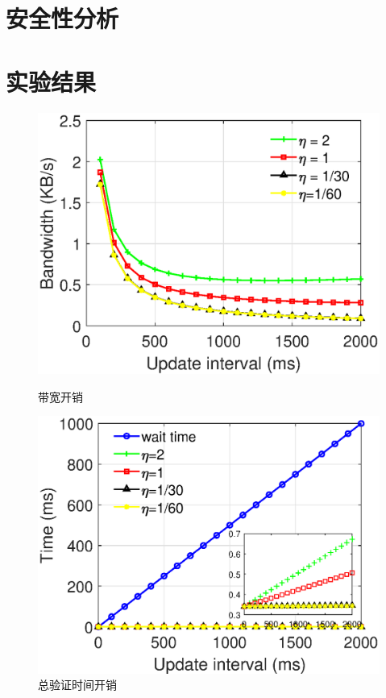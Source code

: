 \section{安全性分析}

\section{实验结果}
\label{sec:experiments}
\begin{figure}[ht]
  \begin{minipage}[b]{0.49\textwidth}
    \includegraphics[width= 3 in]{expr/bandwidth}
    \caption{带宽开销}
    \label{fig:bandwidth}
  \end{minipage}
  \begin{minipage}[b]{0.49\textwidth}
    \includegraphics[width= 3 in]{expr/verify-2}
    \caption{总验证时间开销}
    \label{fig:verify-2}
  \end{minipage}
\centering
\end{figure}


